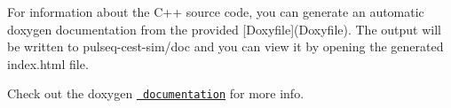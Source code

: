 For information about the C++ source code, you can generate an automatic doxygen documentation from the provided \mbox{[}Doxyfile\mbox{]}(Doxyfile). The output will be written to pulseq-\/cest-\/sim/doc and you can view it by opening the generated index.\+html file.

Check out the doxygen \href{https://www.doxygen.nl/manual/starting.html\#step2}{\texttt{ documentation}} for more info. 